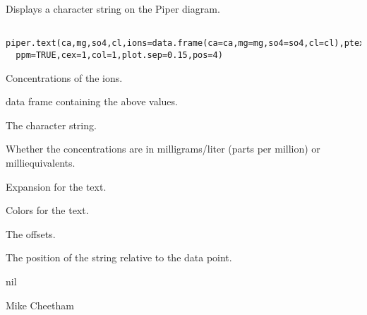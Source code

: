 \begin{Description}\relax
Displays a character string on the Piper diagram.
\end{Description}
\begin{Usage}
\begin{verbatim}
 piper.text(ca,mg,so4,cl,ions=data.frame(ca=ca,mg=mg,so4=so4,cl=cl),ptext,
  ppm=TRUE,cex=1,col=1,plot.sep=0.15,pos=4)
\end{verbatim}
\end{Usage}
\begin{Arguments}
\begin{ldescription}
\item[\code{ca,mg,so4,cl}] Concentrations of the ions.
\item[\code{ions}] data frame containing the above values.
\item[\code{ptext}] The character string.
\item[\code{ppm}] Whether the concentrations are in milligrams/liter (parts per
million) or milliequivalents.
\item[\code{cex}] Expansion for the text.
\item[\code{col}] Colors for the text.
\item[\code{plot.sep}] The offsets.
\item[\code{pos}] The position of the string relative to the data point.
\end{ldescription}
\end{Arguments}
\begin{Value}
nil
\end{Value}
\begin{Author}\relax
Mike Cheetham
\end{Author}
\begin{SeeAlso}\relax
{}
\end{SeeAlso}

